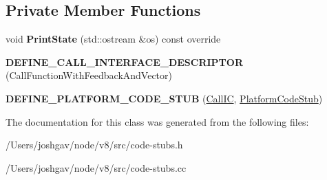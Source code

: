\subsection*{Private Member Functions}
\begin{DoxyCompactItemize}
\item 
void {\bfseries Print\+State} (std\+::ostream \&os) const  override\hypertarget{classv8_1_1internal_1_1_call_i_c_stub_a84ae6f3d4f123d724dd29d7fa41ab64c}{}\label{classv8_1_1internal_1_1_call_i_c_stub_a84ae6f3d4f123d724dd29d7fa41ab64c}

\item 
{\bfseries D\+E\+F\+I\+N\+E\+\_\+\+C\+A\+L\+L\+\_\+\+I\+N\+T\+E\+R\+F\+A\+C\+E\+\_\+\+D\+E\+S\+C\+R\+I\+P\+T\+OR} (Call\+Function\+With\+Feedback\+And\+Vector)\hypertarget{classv8_1_1internal_1_1_call_i_c_stub_a506ee19eb6a680909145e9ec16fbe079}{}\label{classv8_1_1internal_1_1_call_i_c_stub_a506ee19eb6a680909145e9ec16fbe079}

\item 
{\bfseries D\+E\+F\+I\+N\+E\+\_\+\+P\+L\+A\+T\+F\+O\+R\+M\+\_\+\+C\+O\+D\+E\+\_\+\+S\+T\+UB} (\hyperlink{classv8_1_1internal_1_1_call_i_c}{Call\+IC}, \hyperlink{classv8_1_1internal_1_1_platform_code_stub}{Platform\+Code\+Stub})\hypertarget{classv8_1_1internal_1_1_call_i_c_stub_aa5a8a1480f9ee81296c762572c0be31e}{}\label{classv8_1_1internal_1_1_call_i_c_stub_aa5a8a1480f9ee81296c762572c0be31e}

\end{DoxyCompactItemize}


The documentation for this class was generated from the following files\+:\begin{DoxyCompactItemize}
\item 
/\+Users/joshgav/node/v8/src/code-\/stubs.\+h\item 
/\+Users/joshgav/node/v8/src/code-\/stubs.\+cc\end{DoxyCompactItemize}
